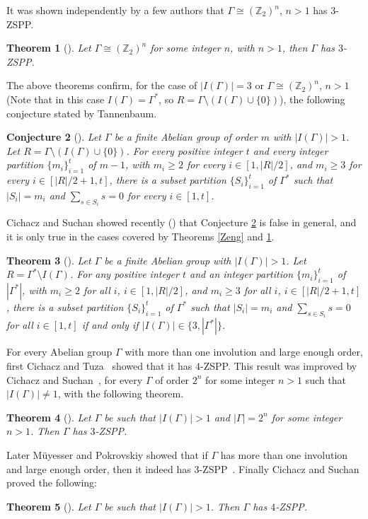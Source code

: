 \documentclass{article}
\newcommand{\zet}{\mathbb{Z}}
\newtheorem{thm}{Theorem}[section]
\newtheorem{conj}[thm]{Conjecture}
\begin{document}
It was shown independently by a few authors that 
$\Gamma\cong (\zet_2)^n$, $n>1$ has $3$-ZSPP.

\begin{thm}[\cite{CaccJia,Egawa,Tannenbaum2}]\label{Sylow}Let $\Gamma\cong (\zet_2)^n$ for some integer $n$, with $n>1$, then $\Gamma$ has $3$-ZSPP. 
\end{thm}


The above theorems confirm, for the case of $|I(\Gamma)|=3$ or $\Gamma\cong (\zet_2)^n$, $n>1$ (Note that in this case $I(\Gamma)=\Gamma^*$, so $R =\Gamma \setminus (I(\Gamma)\cup\{0\})$), the following conjecture stated by Tannenbaum. 
\begin{conj}[\cite{Tannenbaum1}]\label{conjectureT}
Let $\Gamma$ be a finite Abelian group of order $m$ with $|I(\Gamma)|>1$. Let $R =\Gamma \setminus (I(\Gamma)\cup\{0\})$. For every positive integer $t$ and every integer partition $\{m_i\}_{i=1}^t$ of $m-1$, with $m_i \geq 2$ for every {$i\in [1, |R|/2]$}, and {$m_i \geq 3$} for every {$i\in[|R|/2+1, t]$}, there is a subset partition $\{S_i\}_{i=1}^t$ of $\Gamma^*$ such that $|S_i| = m_i$ and $\sum_{s\in S_i}s = 0$ for every {$i\in[ 1, t]$}. 
\end{conj}
Cichacz and Suchan showed recently (\cite{CicrSuch2}) that Conjecture \ref{conjectureT} is false in general, and it is only true in the cases covered by Theorems \ref{Zeng} and \ref{Sylow}.

\begin{thm}[\cite{CicrSuch2}]\label{Skol}
Let $\Gamma$ be a finite Abelian group with $|I(\Gamma)|>1$. Let $R =\Gamma^* \setminus I(\Gamma)$. For any positive integer $t$ and an integer partition $\{m_i\}_{i=1}^t$ of $|\Gamma^*|$, with {$m_i \geq 2$ for all $i$, $i\in[1, |R|/2]$, and {$m_i \geq 3$} for all $i$, $i\in[|R|/2+1,t]$}, there is a subset partition $\{S_i\}_{i=1}^t$ of $\Gamma^*$ such that $|S_i| = m_i$ and $\sum_{s\in S_i}s = 0$ for all  $i\in[1,t]$ if and only if $|I(\Gamma)|\in\{3,|\Gamma^*|\}$.\end{thm}

For every Abelian group $\Gamma$ with more than one involution and large enough order, first Cichacz and Tuza~\cite{CicTuz} showed that it has $4$-ZSPP. This result was improved by Cichacz and Suchan~\cite{CicrSuch}, for every $\Gamma$ of order $2^{n}$ for some integer $n>1$ such that $|I(\Gamma)|\neq 1$, with the following theorem. 
\begin{thm}[\cite{CicrSuch}]\label{SK}Let $\Gamma$ be such that $|I(\Gamma)|>1$ and $|\Gamma|=2^n$ for some integer $n>1$. Then $\Gamma$ has {$3$-ZSPP.}
\end{thm} 
Later M\"{u}yesser and Pokrovskiy showed that if $\Gamma$ has more than one involution and large enough order, then it indeed has $3$-ZSPP~\cite{MP}. Finally Cichacz and Suchan proved the following:
\begin{thm}[\cite{CicrSuch2}]\label{SK2}Let $\Gamma$ be such that $|I(\Gamma)|>1$. Then $\Gamma$ has {$4$-ZSPP.}
\end{thm}
\end{document}
